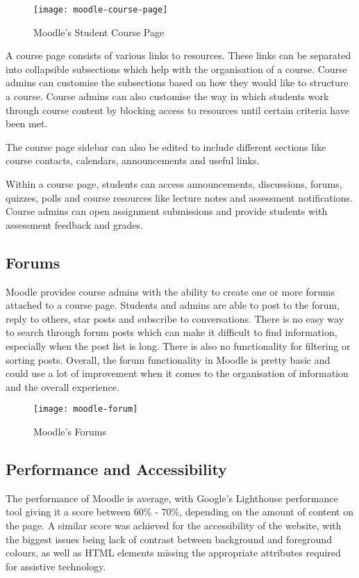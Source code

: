 \begin{figure}[h!]
    \centering
    \texttt{[image: moodle-course-page]}
    \caption{Moodle's Student Course Page}
\end{figure}

A course page consists of various links to resources. These links can be separated into collapsible subsections which help with the organisation of a course.
Course admins can customise the subsections based on how they would like to structure a course.
Course admins can also customise the way in which students work through course content by blocking access to resources until certain criteria have been met.

The course page sidebar can also be edited to include different sections like course contacts, calendars, announcements and useful links.

Within a course page, students can access announcements, discussions, forums, quizzes, polls and course resources like lecture notes and assessment notifications.
Course admins can open assignment submissions and provide students with assessment feedback and grades.

\subsection{Forums}

Moodle provides course admins with the ability to create one or more forums attached to a course page.
Students and admins are able to post to the forum, reply to others, star posts and subscribe to conversations.
There is no easy way to search through forum posts which can make it difficult to find information, especially when the post list is long.
There is also no functionality for filtering or sorting posts.
Overall, the forum functionality in Moodle is pretty basic and could use a lot of improvement when it comes to the organisation of information and the overall experience.

\begin{figure}[h!]
    \centering
    \texttt{[image: moodle-forum]}
    \caption{Moodle's Forums}
\end{figure}

\subsection{Performance and Accessibility}
The performance of Moodle is average, with Google's Lighthouse performance tool giving it a score between 60\% - 70\%, depending on the amount of content on the page.
A similar score was achieved for the accessibility of the website, with the biggest issues being lack of contrast between background and foreground colours, as well as HTML elements missing the appropriate attributes required for assistive technology.

